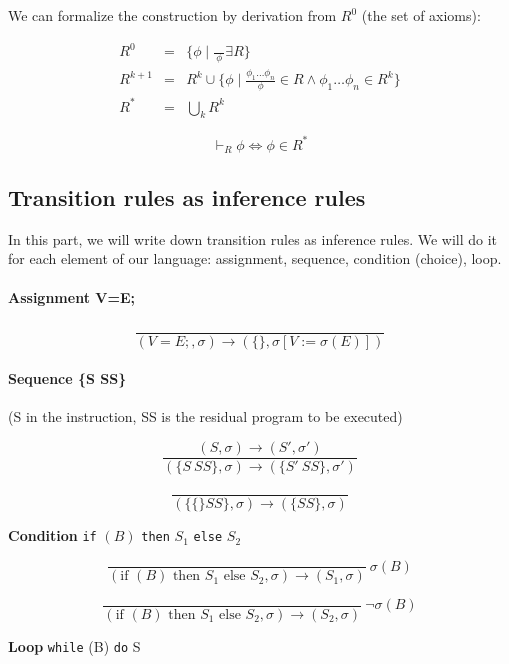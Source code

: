 \documentclass[12pt, a4paper]{book}
\begin{document}
We can formalize the construction by derivation from $R^0$ (the set of axioms):

\begin{eqnarray}
R^{0}   & = & \{\phi \mid \frac{}{\ \phi \ } \exists R\} \\
R^{k+1} & = & R^{k} \cup \{ \phi \mid \frac{\phi_{1} \ldots \phi_{n}}{\phi}
\in R \land \phi_{1}\ldots\phi_{n} \in R^{k} \} \\
R^{*}   & = & \bigcup_{k} R^{k}
\end{eqnarray}

$$
\vdash_{R} \phi \iff \phi \in R^{*}
$$

\subsection{Transition rules as inference rules}
\label{sub:Transition rules as inference rules}

In this part, we will write down transition rules as inference rules. We will
do it for each element of our language: assignment, sequence, condition
(choice), loop.

\paragraph{Assignment V=E;}

$$
\frac{}
{(V=E;,\sigma) \longrightarrow (\{ \}, \sigma [V := \sigma (E)] )}
$$

\paragraph{Sequence \{S SS\}} (S in the instruction, SS is the residual program
to be executed)

$$
\frac{(S,\sigma) \longrightarrow (S',\sigma')}
{(\{ S\ SS \} , \sigma ) \longrightarrow (\{S'\ SS\}, \sigma')}
$$

$$
\frac{}
{(\{ \{ \} SS\}, \sigma) \longrightarrow (\{ SS \}, \sigma)}
$$

\noindent \textbf{Condition} \verb#if# $(B)$ \verb#then# $S_{1}$ \verb#else# $S_{2}$

$$
\frac{}
{(\textrm{if } (B) \textrm{ then } S_{1} \textrm{ else } S_{2}, \sigma) \longrightarrow (S_{1}, \sigma)}
\ \sigma(B)
$$

$$
\frac{}
{(\textrm{if } (B) \textrm{ then } S_{1} \textrm{ else } S_{2}, \sigma) \longrightarrow (S_{2}, \sigma)}
\ \lnot\sigma(B)
$$

\noindent \textbf{Loop} \verb#while# (B) \verb#do# S
\end{document}
